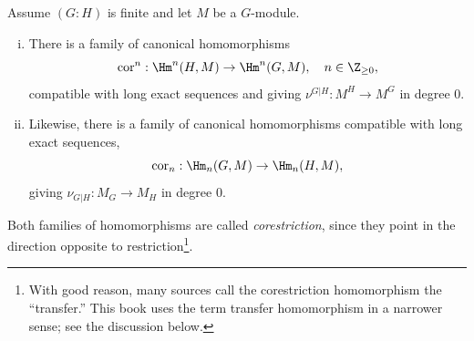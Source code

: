\begin{definition-proposition}\label{def:cor}
	Assume $(G:H)$ is finite and let $M$ be a $G$-module.
	\begin{enumerate}[(i)]
		\item There is a family of canonical homomorphisms
		\[ \mathrm{cor}^n: \Hm^n(H, M) \to \Hm^n(G, M), \quad n \in \Z_{\geq 0}, \]
		compatible with long exact sequences and giving
		$\nu^{G|H}:M^H\to M^G$ in degree $0$.
		\item Likewise, there is a family of canonical homomorphisms compatible
		with long exact sequences,
		\[ \mathrm{cor}_n: \Hm_n(G, M) \to \Hm_n(H, M), \]
		giving $\nu_{G|H}:M_G\to M_H$ in degree $0$.
	\end{enumerate}
	Both families of homomorphisms are called \emph{corestriction}, since they
	point in the direction opposite to restriction\footnote{With good reason,
	many sources call the corestriction homomorphism the “transfer.” This book
	uses the term transfer homomorphism in a narrower sense; see the discussion
	below.}.
\end{definition-proposition}
